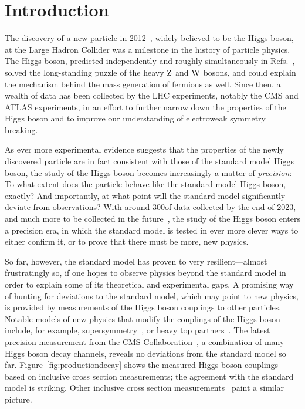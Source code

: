 \section{Introduction}
\label{sec:introduction}


The discovery of a new particle in 2012~\cite{Aad:2012tfa,Chatrchyan:2012xdj,Chatrchyan:2013lba}, widely believed to be the Higgs boson, at the Large Hadron Collider was a milestone in the history of particle physics.
% 
The Higgs boson, predicted independently and roughly simultaneously in Refs.~\cite{Higgs:1964pj,Englert:1964et,Guralnik:1964eu}, solved the long-standing puzzle of the heavy $\mathrm{Z}$ and $\mathrm{W}$ bosons, and could explain the mechanism behind the mass generation of fermions as well.
% 
Since then, a wealth of data has been collected by the LHC experiments, notably the CMS and ATLAS experiments, in an effort to further narrow down the properties of the Higgs boson and to improve our understanding of electroweak symmetry breaking.


As ever more experimental evidence suggests that the properties of the newly discovered particle are in fact consistent with those of the standard model Higgs boson,
% 
% 
the study of the Higgs boson becomes increasingly a matter of \textit{precision}: To what extent does the particle behave like the standard model Higgs boson, exactly?
% 
And importantly, at what point will the standard model significantly deviate from observations?
% 
With around 300\fbinv of data collected by the end of 2023, and much more to be collected in the future~\cite{hllhc}, the study of the Higgs boson enters a precision era, in which the standard model is tested in ever more clever ways to either confirm it, or to prove that there must be more, new physics.


So far, however, the standard model has proven to very resilient---almost frustratingly so, if one hopes to observe physics beyond the standard model in order to explain some of its theoretical and experimental gaps.
% 
A promising way of hunting for deviations to the standard model, which may point to new physics, is provided by measurements of the Higgs boson couplings to other particles.
% 
Notable models of new physics that modify the couplings of the Higgs boson include, for example, supersymmetry~\cite{Dimopoulos:1981zb,Witten:1981nf}, or heavy top partners~\cite{ArkaniHamed:2002qy,Banfi:2013yoa}.
% 
The latest precision measurement from the CMS Collaboration~\cite{Sirunyan:2018koj}, a combination of many Higgs boson decay channels, reveals no deviations from the standard model so far.
% 
Figure~\ref{fig:productiondecay} shows the measured Higgs boson couplings based on inclusive cross section measurements; the agreement with the standard model is striking.
% 
Other inclusive cross section measurements~\cite{Khachatryan:2016vau,Aad:2015zhl} paint a similar picture.


